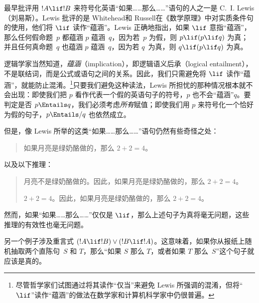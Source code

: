 \documentclass[../../../include/open-logic-section]{subfiles}
\begin{document}


最早批评用 $!A \lif !B$ 来符号化英语“如果……那么……”语句的人之一是 C.~I. Lewis（刘易斯）。Lewis 批评的是 Whitehead和 Russell在《数学原理》中对实质条件句的使用，他们将 $\lif$ 读作“蕴涵”。Lewis 正确地指出，如果 $\lif$ 意指“蕴涵”，那么任何假命题~$p$ 都蕴涵 $p$ 蕴涵~$q$，因为若~$p$ 为假，则 $p \lif (p \lif q)$ 为真；并且任何真命题~$q$ 也蕴涵 $p$ 蕴涵~$q$，因为若 $q$~为真，则 $q \lif (p \lif q)$ 为真。

逻辑学家当然知道，\emph{蕴涵}（implication），即逻辑语义后承（logical entailment），不是联结词，而是公式或语句之间的关系。因此，我们只需避免将 $\lif$ 读作“蕴涵”，就能防止混淆。\footnote{尽管哲学家们试图通过将其读作“仅当”来避免 Lewis 所强调的混淆，但将“$\lif$”读作“蕴涵”的做法在数学家和计算机科学家中仍很普遍。}只要我们避免这种读法，Lewis 所担忧的那种情况根本就不会出现：即使我们把 $p$ 看作代表一个假的英语句子的符号，$p$ 也不会“蕴涵”$q$。要判定是否 $p \Entails q$，我们必须考虑\emph{所有}赋值；即使我们用 $p$ 来符号化一个恰好为假的句子，$p \Entails/ q$ 也依然成立。

但是，像 Lewis 所举的这类“如果……那么……”语句仍然有些奇怪之处：

\begin{quote}
如果月亮是绿奶酪做的，那么 $2+2=4$。
\end{quote}

以及以下推理：

\begin{quote}
月亮不是绿奶酪做的。因此，如果月亮是绿奶酪做的，那么 $2+2=4$。

$2+2 = 4$。因此，如果月亮是绿奶酪做的，那么 $2+2=4$。
\end{quote}

然而，如果“如果……那么……”仅仅是 $\lif$，那么上述句子为真将毫无问题，这些推理的有效性也毫无问题。

另一个例子涉及重言式 $(!A \lif !B) \lor (!B \lif
!A)$。这意味着，如果你从报纸上随机抽取两个直陈句~$S$ 和 $T$，那么“如果 $S$ 那么 $T$，或者如果 $T$ 那么~$S$”这个句子就应该是真的。
\end{document}
